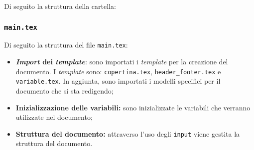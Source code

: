 Di seguito la struttura della cartella:

\vspace{0.5cm}


\subsubsection{\texttt{main.tex}}
Di seguito la struttura del file \texttt{main.tex}:
\begin{itemize}
	\item \textbf{\textit{Import} dei \textit{template}}: sono importati i \textit{template} per la
	      creazione del documento. I \textit{template} sono: \texttt{copertina.tex},
	      \texttt{header\_footer.tex} e \texttt{variable.tex}. In aggiunta, sono
	      importati i modelli specifici per il documento che si sta redigendo;

	\item \textbf{Inizializzazione delle variabili:} sono inizializzate le
	      variabili che verranno utilizzate nel documento;

	\item \textbf{Struttura del documento:} attraverso l'uso degli
	      \texttt{input} viene gestita la struttura del documento.
\end{itemize}

